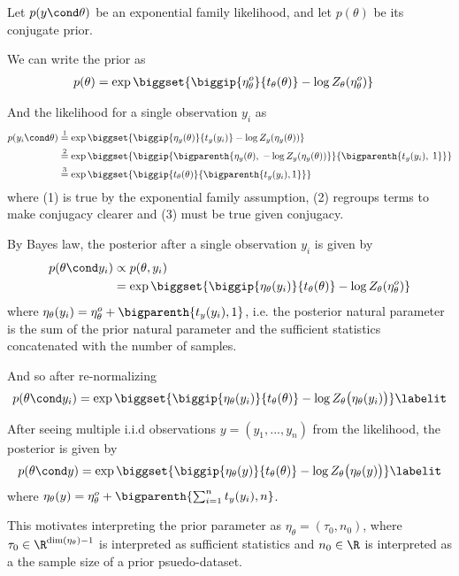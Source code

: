 Let $p(y \cond \theta)$ be an exponential family likelihood, and let $p(\theta)$ be its conjugate prior. 

We can write the prior as 
\begin{align*}
p(\theta ) &= \exp \biggset{\biggip{\eta_\theta^o}{t_\theta (\theta)} - \log Z_\theta(\eta_\theta^o)} 
\end{align*}

And the likelihood for a single observation $y_i$ as 
\begin{align*}
p(y_i \cond \theta)  & \stackrel{1}{=} \exp \biggset{ \biggip{\eta_y(\theta)}{t_y(y_i)} - \log Z_y (\eta_y(\theta)) } \\
& \stackrel{2}{=} \exp \biggset{ \biggip{ \bigparenth{\eta_y(\theta), \; - \log Z_y (\eta_y(\theta))}}{\bigparenth{t_y(y_i), \; 1}}  } \\
& \stackrel{3}{=} \exp \biggset{ \biggip{t_\theta(\theta)}{\bigparenth{t_y(y_i),1}}}   
\end{align*}
where (1) is true by the exponential family assumption, (2) regroups terms to make conjugacy clearer and (3) must be true given conjugacy. 


By Bayes law, the posterior after a single observation $y_i$ is given by
\begin{align*}
p(\theta \cond y_i)  &\propto p(\theta, y_i) \\
	&=\exp \biggset{ \biggip{ \eta_\theta(y_i)}{t_\theta(\theta) } - \log Z_\theta(\eta_\theta^o)} 
\end{align*}
where $\eta_\theta(y_i) = \eta_\theta^o + \bigparenth{t_y(y_i),1}$, i.e. the posterior natural parameter is the sum of the prior natural parameter and the sufficient statistics concatenated with the number of samples. 

And so after re-normalizing
\begin{align*}
p(\theta \cond y_i)  = \exp \biggset{ \biggip{ \eta_\theta(y_i)}{t_\theta(\theta) } - \log Z_\theta \big(\eta_\theta(y_i)\big)}
\labelit \label{eqn:posterior_for_exponential_family_after_one_obs} 
\end{align*}
  
After seeing multiple i.i.d observations $y=(y_1,...,y_n)$ from the likelihood, the posterior is given by
\begin{align*}
p(\theta \cond y)  = \exp \biggset{ \biggip{\eta_\theta(y)}{t_\theta(\theta) } - \log Z_\theta \big(\eta_\theta(y)\big)} 
\labelit \label{eqn:posterior_for_exponential_family_after_many_obs} 
\end{align*}
where $\eta_\theta(y) = \eta_\theta^o + \bigparenth{ \sum_{i=1}^n t_y(y_i),n}$.

This motivates interpreting the prior parameter as $\eta_\theta = (\tau_0, n_0)$, where $\tau_0 \in \R^{\dim(\eta_\theta) - 1}$ is interpreted as sufficient statistics and $n_0 \in \R$ is interpreted as a the sample size of a prior psuedo-dataset. 
